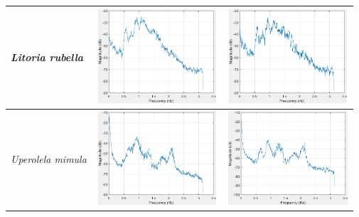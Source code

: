 \begin{table}[htb!]
{\begin{tabular}{lll}
\textit{Litoria rubella}             &    \begin{minipage}{.3\textwidth} \includegraphics[width=45mm, height=35mm]{image/Ch1/7_signal.png}  \end{minipage}                               &                                               \begin{minipage}{.3\textwidth} \includegraphics[width=45mm, height=35mm]{image/Ch1/7_noise.png}  \end{minipage} \\ \hline
\textit{Uperolela mimula}            &   \begin{minipage}{.3\textwidth} \includegraphics[width=45mm, height=35mm]{image/Ch1/8_signal.png}  \end{minipage}                              &                                             \begin{minipage}{.3\textwidth} \includegraphics[width=45mm, height=35mm]{image/Ch1/8_noise.png}  \end{minipage} \\ \hline\hline
\end{tabular}
}
\end{table}



